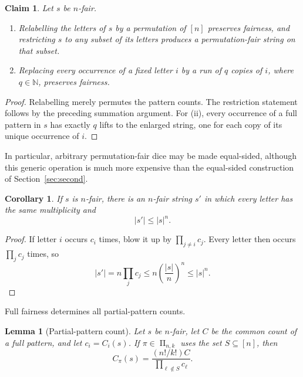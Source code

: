 \documentclass[11pt]{article}
\newtheorem{lemma}[theorem]{Lemma}
\newtheorem{corollary}[theorem]{Corollary}
\newtheorem{claim}[theorem]{Claim}
\theoremstyle{definition}
\theoremstyle{remark}
\newcommand{\N}{\mathbb{N}}
\newcommand{\PiSet}{\mathop{\Pi}}
\begin{document}
\begin{claim}\label{clm:restriction-blowup}
Let \(s\) be \(n\)-fair.
\begin{enumerate}[label=(\roman*)]
  \item Relabelling the letters of \(s\) by a permutation of \([n]\) preserves
        fairness, and restricting \(s\) to any subset of its letters produces
        a permutation-fair string on that subset.
  \item Replacing every occurrence of a fixed letter \(i\) by a run of \(q\)
        copies of \(i\), where \(q\in\N\), preserves fairness.
\end{enumerate}
\end{claim}

\begin{proof}
Relabelling merely permutes the pattern counts.  The restriction statement
follows by the preceding summation argument.  For (ii), every occurrence of a
full pattern in \(s\) has exactly \(q\) lifts to the enlarged string, one for
each copy of its unique occurrence of \(i\).
\end{proof}

In particular, arbitrary permutation-fair dice may be made equal-sided, although this
generic operation is much more expensive than the equal-sided construction of
Section~\ref{sec:second}.

\begin{corollary}\label{cor:equalize}
If \(s\) is \(n\)-fair, there is an \(n\)-fair string \(s'\) in which every
letter has the same multiplicity and
\[
  |s'|\leq |s|^n.
\]
\end{corollary}

\begin{proof}
If letter \(i\) occurs \(c_i\) times, blow it up by
\(\prod_{j\neq i}c_j\).  Every letter then occurs \(\prod_jc_j\) times, so
\[
  |s'|=n\prod_jc_j
  \leq n\left(\frac{|s|}{n}\right)^n
  \leq |s|^n.
\]
\end{proof}

Full fairness determines all partial-pattern counts.

\begin{lemma}[Partial-pattern count]\label{lem:partial}
Let \(s\) be \(n\)-fair, let \(C\) be the common count of a full pattern, and
let \(c_i=C_i(s)\).  If \(\pi\in\PiSet_{n,k}\) uses the set \(S\subseteq[n]\),
then
\begin{equation}\label{eq:partial-count}
  C_\pi(s)
  =\frac{(n!/k!)C}{\prod_{\ell\notin S}c_\ell}.
\end{equation}
\end{lemma}
\end{document}

